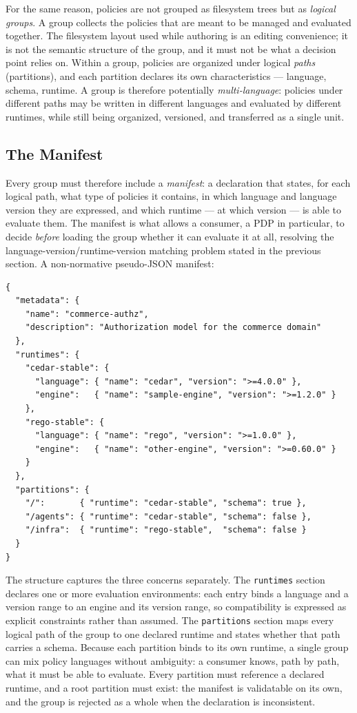 \documentclass[11pt,a4paper]{article}
\newcommand{\term}[1]{\emph{#1}}                 %
\newcommand{\field}[1]{\texttt{#1}}              %
\begin{document}
For the same reason, policies are not grouped as filesystem trees but as
\term{logical groups}. A group collects the policies that are meant to be
managed and evaluated together. The filesystem layout used while
authoring is an editing convenience; it is not the semantic structure of
the group, and it must not be what a decision point relies on. Within a
group, policies are organized under logical \term{paths} (partitions),
and each partition declares its own characteristics --- language, schema,
runtime. A group is therefore potentially \term{multi-language}: policies
under different paths may be written in different languages and evaluated
by different runtimes, while still being organized, versioned, and
transferred as a single unit.

\subsection{The Manifest}

Every group must therefore include a \term{manifest}: a declaration that
states, for each logical path, what type of policies it contains, in
which language and language version they are expressed, and which runtime
--- at which version --- is able to evaluate them. The manifest is what
allows a consumer, a PDP in particular, to decide \emph{before} loading
the group whether it can evaluate it at all, resolving the
language-version/runtime-version matching problem stated in the previous
section. A non-normative pseudo-JSON manifest:

\begin{lstlisting}
{
  "metadata": {
    "name": "commerce-authz",
    "description": "Authorization model for the commerce domain"
  },
  "runtimes": {
    "cedar-stable": {
      "language": { "name": "cedar", "version": ">=4.0.0" },
      "engine":   { "name": "sample-engine", "version": ">=1.2.0" }
    },
    "rego-stable": {
      "language": { "name": "rego", "version": ">=1.0.0" },
      "engine":   { "name": "other-engine", "version": ">=0.60.0" }
    }
  },
  "partitions": {
    "/":       { "runtime": "cedar-stable", "schema": true },
    "/agents": { "runtime": "cedar-stable", "schema": false },
    "/infra":  { "runtime": "rego-stable",  "schema": false }
  }
}
\end{lstlisting}

The structure captures the three concerns separately. The
\field{runtimes} section declares one or more evaluation environments:
each entry binds a language and a version range to an engine and its
version range, so compatibility is expressed as explicit constraints
rather than assumed. The \field{partitions} section maps every logical
path of the group to one declared runtime and states whether that path
carries a schema. Because each partition binds to its own runtime, a
single group can mix policy languages without ambiguity: a consumer
knows, path by path, what it must be able to evaluate. Every partition
must reference a declared runtime, and a root partition must exist: the
manifest is validatable on its own, and the group is rejected as a whole
when the declaration is inconsistent.
\end{document}
